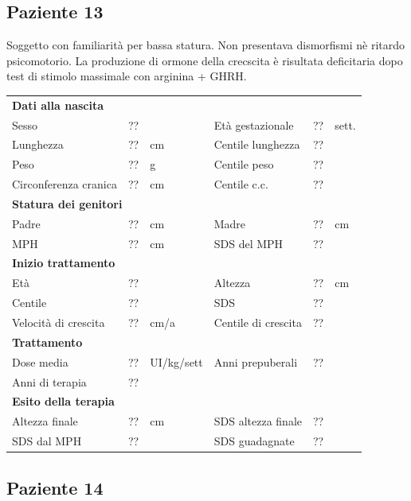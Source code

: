 \subsection*{Paziente 13}%

Soggetto con familiarità per bassa statura. Non presentava dismorfismi nè ritardo psicomotorio. La produzione di ormone della crecscita è risultata deficitaria dopo test di stimolo massimale con arginina + GHRH.

\begin{table}[!h]
\begin{tabular}{lrllrl}
\toprule
\multicolumn{6}{l}{\textbf{Dati alla nascita}}\\
Sesso 		& \multicolumn{2}{l}{??} 	& Età gestazionale 		& ?? 		& sett.\\
Lunghezza 	& ?? 		& cm 				& Centile lunghezza		& ?? 		\\
Peso 		& ?? 		& g					& Centile peso			& ?? 		\\
Circonferenza cranica	& ?? 		& cm 	& Centile c.c.			& ?? \\
\midrule
\multicolumn{6}{l}{\textbf{Statura dei genitori}}\\
Padre 		& ?? & cm 	& Madre 				& ?? & cm \\
MPH 		& ?? & cm 	& SDS del MPH 			& ??\\
\midrule
\multicolumn{6}{l}{\textbf{Inizio trattamento}} \\
Età	& ?? & 		& Altezza 				& ?? & cm  \\
Centile & ?? 	 &		& SDS		& ?? \\
Velocità di crescita & ?? & cm/a	& Centile di crescita & ??\\
\midrule
\multicolumn{6}{l}{\textbf{Trattamento}} \\
Dose media		& ?? & UI/kg/sett & Anni prepuberali & ??\\
Anni di terapia & ??\\
\midrule
\multicolumn{6}{l}{\textbf{Esito della terapia}} \\
Altezza finale			& ?? & cm 	& SDS altezza finale		& ??\\
SDS dal MPH				& ?? &		& SDS guadagnate 			& ??\\
\bottomrule
\end{tabular}
\end{table}
\clearpage


\subsection*{Paziente 14}%

